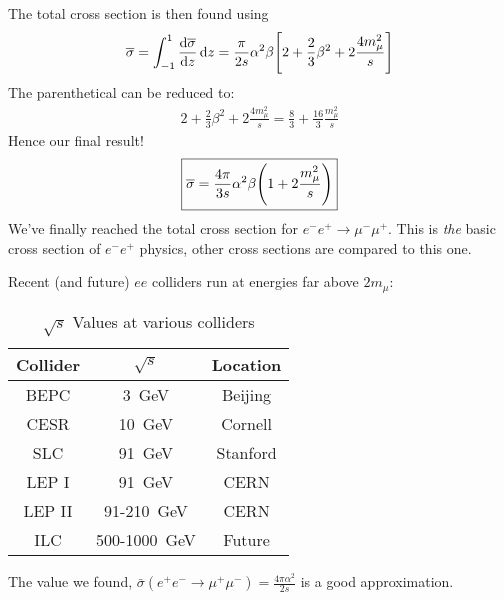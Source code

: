 The total cross section is then found using
\begin{align*}
  \overline{\sigma}=\int_{-1}^1\dv{\overline{\sigma}}{z}\dd{z}
  =\frac{\pi}{2s}\alpha^2\beta\qty[2+\frac23\beta^2+2\frac{4m_\mu^2}{s}]
\end{align*}
The parenthetical can be reduced to:
\begin{align*}
  2+\frac23\beta^2+2\frac{4m_\mu^2}{s}=\frac83+\frac{16}3\frac{m_\mu^2}{s}
\end{align*}
Hence our final result!
\begin{align*}
  \boxed{\overline{\sigma}=\frac{4\pi}{3s}\alpha^2\beta\qty(1+2\frac{m_\mu^2}{s})}
\end{align*}
We've finally reached the total cross section for $e^-e^+\to\mu^-\mu^+$. This is \emph{the} basic cross section of $e^-e^+$ physics, other cross sections are compared to this one.

Recent (and future) $ee$ colliders run at energies far above $2m_\mu$:
\begin{table}[H]
  \centering
  \begin{tabular}{ccc}
    Collider & $\sqrt{s}$        & Location\\ \midrule
    BEPC   & \SI{3}{\GeV}        & Beijing\\ \midrule
    CESR   & \SI{10}{\GeV}       & Cornell\\ \midrule
    SLC    & \SI{91}{\GeV}       & Stanford\\ \midrule
    LEP I  & \SI{91}{\GeV}       & CERN\\ \midrule
    LEP II & 91-\SI{210}{\GeV}   & CERN\\ \midrule
    ILC    & 500-\SI{1000}{\GeV} & Future\\
  \end{tabular}
  \caption{$\sqrt{s}$ Values at various colliders}\label{tab:1}
\end{table}
The value we found, $\bar{\sigma}(e^+e^-\to\mu^+\mu^-)=\frac{4\pi\alpha^2}{2s}$ is a good approximation.

